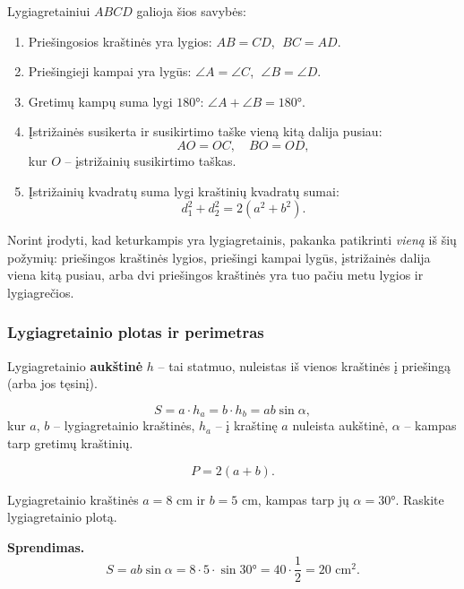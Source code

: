 \begin{theorem}
Lygiagretainiui $ABCD$ galioja šios savybės:
\begin{enumerate}
    \item Priešingosios kraštinės yra lygios: $AB = CD$, $\; BC = AD$.
    \item Priešingieji kampai yra lygūs: $\angle A = \angle C$, $\; \angle B = \angle D$.
    \item Gretimų kampų suma lygi $180°$: $\angle A + \angle B = 180°$.
    \item Įstrižainės susikerta ir susikirtimo taške vieną kitą dalija pusiau:
    \[
    AO = OC, \quad BO = OD,
    \]
    kur $O$ – įstrižainių susikirtimo taškas.
    \item Įstrižainių kvadratų suma lygi kraštinių kvadratų sumai:
    \[
    d_1^2 + d_2^2 = 2(a^2 + b^2).
    \]
\end{enumerate}
\end{theorem}

\begin{remark}
Norint įrodyti, kad keturkampis yra lygiagretainis, pakanka patikrinti \emph{vieną} iš šių požymių: priešingos kraštinės lygios, priešingi kampai lygūs, įstrižainės dalija viena kitą pusiau, arba dvi priešingos kraštinės yra tuo pačiu metu lygios ir lygiagrečios.
\end{remark}

\subsubsection*{Lygiagretainio plotas ir perimetras}

Lygiagretainio \textbf{aukštinė} $h$ – tai statmuo, nuleistas iš vienos kraštinės į priešingą (arba jos tęsinį).

\begin{tcolorbox}[colback=blue!5!white, colframe=blue!60!black, title=Lygiagretainio ploto formulės]
\[
S = a \cdot h_a = b \cdot h_b = ab\sin\alpha,
\]
kur $a$, $b$ – lygiagretainio kraštinės, $h_a$ – į kraštinę $a$ nuleista aukštinė, $\alpha$ – kampas tarp gretimų kraštinių.
\end{tcolorbox}

\begin{tcolorbox}[colback=green!5!white, colframe=green!60!black, title=Lygiagretainio perimetras]
\[
P = 2(a + b).
\]
\end{tcolorbox}

\begin{example}
Lygiagretainio kraštinės $a = 8$ cm ir $b = 5$ cm, kampas tarp jų $\alpha = 30°$. Raskite lygiagretainio plotą.

\textbf{Sprendimas.}
\[
S = ab\sin\alpha = 8 \cdot 5 \cdot \sin 30° = 40 \cdot \frac{1}{2} = 20 \text{ cm}^2.
\]
\end{example}

